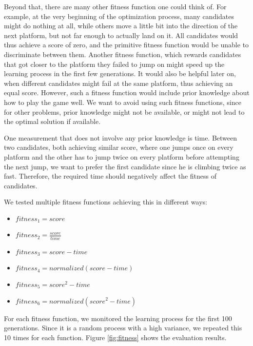 \documentclass[a4paper,12pt,pagesize,headsepline,bibtotoc,titlepage,abstracton]{scrartcl}
\begin{document}
Beyond that, there are many other fitness function one could think of. For example, at the very beginning of the optimization process, many candidates might do nothing at all, while others move a little bit into the direction of the next platform, but not far enough to actually land on it. All candidates would thus achieve a score of zero, and the primitive fitness function would be unable to discriminate between them. Another fitness function, which rewards candidates that got closer to the platform they failed to jump on might speed up the learning process in the first few generations. It would also be helpful later on, when different candidates might fail at the same platform, thus achieving an equal score. However, such a fitness function would include prior knowledge about how to play the game well. We want to avoid using such fitness functions, since for other problems, prior knowledge might not be available, or might not lead to the optimal solution if available. 

One measurement that does not involve any prior knowledge is time. Between two candidates, both achieving similar score, where one jumps once on every platform and the other has to jump twice on every platform before attempting the next jump, we want to prefer the first candidate since he is climbing twice as fast. Therefore, the required time should negatively affect the fitness of candidates.

We tested multiple fitness functions achieving this in different ways:
\begin{itemize}
\item $fitness_1 = score$
\item $fitness_2 = \frac{score}{time}$
\item $fitness_3 = score - time$
\item $fitness_4 = normalized(score - time)$
\item $fitness_5 = score^2 - time$
\item $fitness_6 = normalized(score^2 - time)$
\end{itemize}

For each fitness function, we monitored the learning process for the first 100 generations. Since it is a random process with a high variance, we repeated this 10 times for each function. Figure \ref{fig:fitness} shows the evaluation results. 
\end{document}
